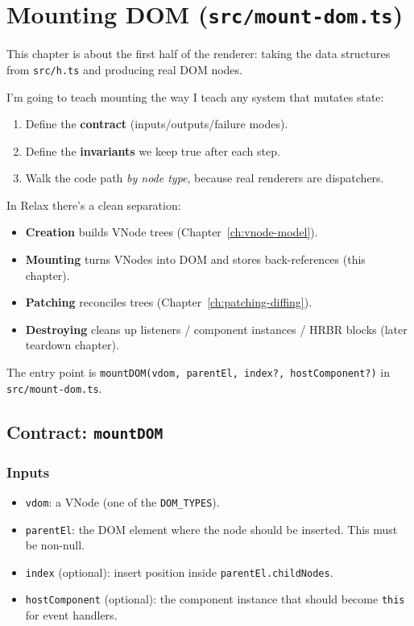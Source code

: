 \chapter{Mounting DOM (\texttt{src/mount-dom.ts})}
\label{ch:mounting}

This chapter is about the first half of the renderer: taking the data structures from \texttt{src/h.ts} and producing real DOM nodes.

I'm going to teach mounting the way I teach any system that mutates state:

\begin{enumerate}
  \item Define the \textbf{contract} (inputs/outputs/failure modes).
  \item Define the \textbf{invariants} we keep true after each step.
  \item Walk the code path \emph{by node type}, because real renderers are dispatchers.
\end{enumerate}

In Relax there's a clean separation:

\begin{itemize}
  \item \textbf{Creation} builds VNode trees (Chapter~\ref{ch:vnode-model}).
  \item \textbf{Mounting} turns VNodes into DOM and stores back-references (this chapter).
  \item \textbf{Patching} reconciles trees (Chapter~\ref{ch:patching-diffing}).
  \item \textbf{Destroying} cleans up listeners / component instances / HRBR blocks (later teardown chapter).
\end{itemize}

The entry point is \texttt{mountDOM(vdom, parentEl, index?, hostComponent?)} in \texttt{src/mount-dom.ts}.

\section{Contract: \texttt{mountDOM}}

\subsection*{Inputs}
\begin{itemize}
  \item \texttt{vdom}: a VNode (one of the \texttt{DOM\_TYPES}).
  \item \texttt{parentEl}: the DOM element where the node should be inserted. This must be non-null.
  \item \texttt{index} (optional): insert position inside \texttt{parentEl.childNodes}.
  \item \texttt{hostComponent} (optional): the component instance that should become \texttt{this} for event handlers.
\end{itemize}

